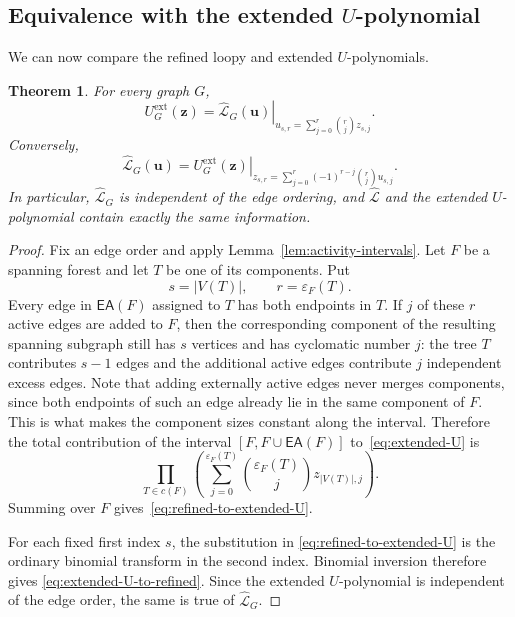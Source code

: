 \documentclass[11pt]{article}
\theoremstyle{plain}
\newtheorem{theorem}{Theorem}[section]
\theoremstyle{definition}
\renewcommand{\mathcal}{\mathscr}
\newcommand{\LL}{\mathcal{L}}    %
\newcommand{\bu}{\mathbf{u}}
\newcommand{\bz}{\mathbf{z}}
\newcommand{\EA}{\mathsf{EA}} %
\newcommand{\eps}{\varepsilon}
\newcommand{\ext}{\mathrm{ext}}
\numberwithin{equation}{section}
\begin{document}
\subsection{Equivalence with the extended \texorpdfstring{$U$}{U}-polynomial}\label{subsec:refined-extended}

We can now compare the refined loopy and extended $U$-polynomials.

\begin{theorem}\label{thm:refined-extended-U}
For every graph $G$,
\begin{equation}\label{eq:refined-to-extended-U}
   U_G^{\ext}(\bz)
   =
   \left.
      \widehat{\LL}_G(\bu)
   \right|_{
      u_{s,r}=\sum_{j=0}^r\binom{r}{j}z_{s,j}
   }.
\end{equation}
Conversely,
\begin{equation}\label{eq:extended-U-to-refined}
   \widehat{\LL}_G(\bu)
   =
   \left.
      U_G^{\ext}(\bz)
   \right|_{
      z_{s,r}=\sum_{j=0}^r(-1)^{r-j}\binom{r}{j}u_{s,j}
   }.
\end{equation}
In particular, $\widehat{\LL}_G$ is independent of the edge ordering, and
$\widehat{\LL}$ and the extended $U$-polynomial contain exactly the same information.
\end{theorem}

\begin{proof}
Fix an edge order and apply Lemma~\ref{lem:activity-intervals}.  Let $F$ be a
spanning forest and let $T$ be one of its components.  Put
\[
   s=|V(T)|,
   \qquad
   r=\eps_F(T).
\]
Every edge in $\EA(F)$ assigned to $T$ has both endpoints in $T$.
If $j$ of these $r$ active edges are added to $F$, then the corresponding component of the resulting spanning subgraph
still has $s$ vertices and has cyclomatic number $j$: the tree $T$ contributes $s-1$ edges and the
additional active edges contribute $j$ independent excess edges.
Note that adding externally active edges never merges components, since both
endpoints of such an edge already lie in the same component of $F$.  This is
what makes the component sizes constant along the interval.
Therefore the total contribution of the interval
$[F,F\cup\EA(F)]$ to~\eqref{eq:extended-U} is
\[
   \prod_{T\in c(F)}
   \left(
      \sum_{j=0}^{\eps_F(T)}
      \binom{\eps_F(T)}{j}
      z_{|V(T)|,j}
   \right).
\]
Summing over $F$ gives~\eqref{eq:refined-to-extended-U}.

For each fixed first index $s$, the substitution in
\eqref{eq:refined-to-extended-U} is the ordinary binomial transform in the
second index.  Binomial inversion therefore gives
\eqref{eq:extended-U-to-refined}.  Since the extended $U$-polynomial is
independent of the edge order, the same is true of $\widehat{\LL}_G$.
\end{proof}
\end{document}
